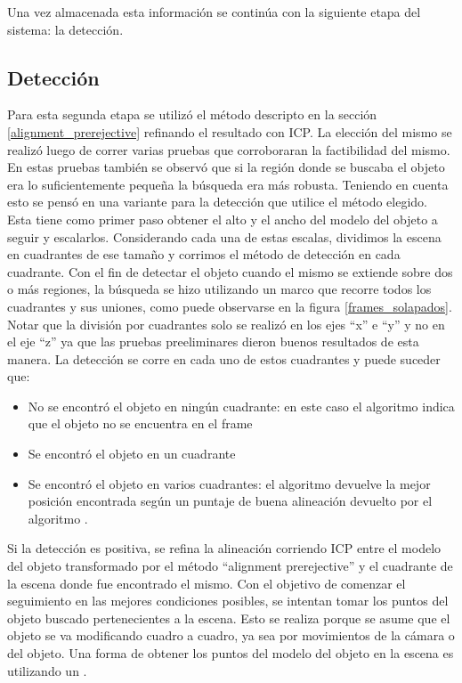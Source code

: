 Una vez almacenada esta información se continúa con la siguiente etapa del sistema: la detección.


\subsection{Detección}\label{deteccion_d}
Para esta segunda etapa se utilizó el método descripto en la sección \ref{alignment_prerejective} refinando el resultado con ICP. La elección del mismo se realizó luego de correr varias pruebas que corroboraran la factibilidad del mismo. En estas pruebas también se observó que si la región donde se buscaba el objeto era lo suficientemente pequeña la búsqueda era más robusta. Teniendo en cuenta esto se pensó en una variante para la detección que utilice el método elegido. Esta tiene como primer paso obtener el alto y el ancho del modelo del objeto a seguir y escalarlos. Considerando cada una de estas escalas, dividimos la escena en cuadrantes de ese tamaño y corrimos el método de detección en cada cuadrante. Con el fin de detectar el objeto cuando el mismo se extiende sobre dos o más regiones, la búsqueda se hizo utilizando un marco que recorre todos los cuadrantes y sus uniones, como puede observarse en la figura \ref{frames_solapados}. Notar que la división por cuadrantes solo se realizó en los ejes ``x'' e ``y'' y no en el eje ``z'' ya que las pruebas preeliminares dieron buenos resultados de esta manera. La detección se corre en cada uno de estos cuadrantes y puede suceder que:
\begin{itemize}
	\item No se encontró el objeto en ningún cuadrante: en este caso el algoritmo indica que el objeto no se encuentra en el frame
	\item Se encontró el objeto en un cuadrante
	\item Se encontró el objeto en varios cuadrantes: el algoritmo devuelve la mejor posición encontrada según un puntaje de buena alineación devuelto por el algoritmo \ap.
\end{itemize}

Si la detección es positiva, se refina la alineación corriendo ICP entre el modelo del objeto transformado por el método ``alignment prerejective'' y el cuadrante de la escena donde fue encontrado el mismo. Con el objetivo de comenzar el seguimiento en las mejores condiciones posibles, se intentan tomar los puntos del objeto buscado pertenecientes a la escena. Esto se realiza porque se asume que el objeto se va modificando cuadro a cuadro, ya sea por movimientos de la cámara o del objeto. Una forma de obtener los puntos del modelo del objeto en la escena es utilizando un \kdt.

